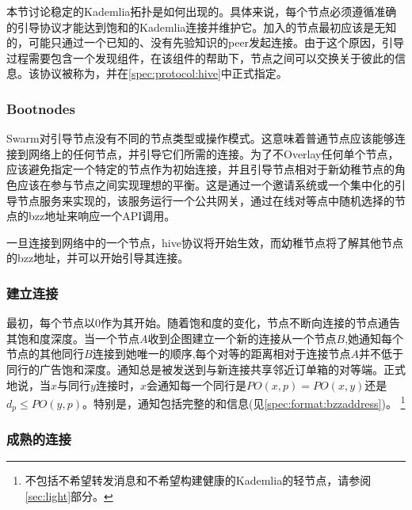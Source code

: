 本节讨论稳定的Kademlia拓扑是如何出现的。具体来说，每个节点必须遵循准确的引导协议才能达到饱和的Kademlia连接并维护它。加入的节点最初应该是无知的，可能只通过一个已知的、没有先验知识的peer发起连接。由于这个原因，引导过程需要包含一个发现组件，在该组件的帮助下，节点之间可以交换关于彼此的信息。该协议被称为，并在\ref{spec:protocol:hive}中正式指定。

\subsubsection{Bootnodes}

Swarm对引导节点没有不同的节点类型或操作模式。这意味着普通节点应该能够连接到网络上的任何节点，并引导它们所需的连接。为了不Overlay任何单个节点，应该避免指定一个特定的节点作为初始连接，并且引导节点相对于新幼稚节点的角色应该在参与节点之间实现理想的平衡。这是通过一个邀请系统或一个集中化的引导节点服务来实现的，该服务运行一个公共网关，通过在线对等点中随机选择的节点的bzz地址来响应一个API调用。

一旦连接到网络中的一个节点，hive协议将开始生效，而幼稚节点将了解其他节点的bzz地址，并可以开始引导其连接。

\subsubsection{建立连接}

最初，每个节点以0作为其开始。随着饱和度的变化，节点不断向连接的节点通告其饱和度深度。当一个节点$A$收到企图建立一个新的连接从一个节点$B$,她通知每个节点的其他同行$B$连接到她唯一的顺序,每个对等的距离相对于连接节点$A$并不低于同行的广告饱和深度。通知总是被发送到与新连接共享邻近订单箱的对等端。正式地说，当$x$与同行$y$连接时，$x$会通知每一个同行是$\mathit{PO}(x, p) = \mathit{PO}(x, y)$还是$d_p\leq \mathit{PO}(y, p)$。特别是，通知包括完整的和信息(见\ref{spec:format:bzzaddress})。%
%
\footnote{不包括不希望转发消息和不希望构建健康的Kademlia的轻节点，请参阅\ref{sec:light}部分。 }

    


\subsubsection{成熟的连接}

